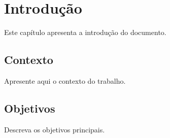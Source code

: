 \section{Introdução}

Este capítulo apresenta a introdução do documento.

\subsection{Contexto}

Apresente aqui o contexto do trabalho.

\subsection{Objetivos}

Descreva os objetivos principais.
